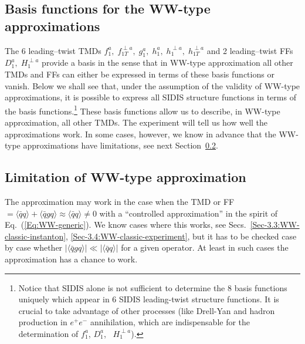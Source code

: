 \documentclass[a4paper,11pt]{article}
\newcommand{\blue}[1]{{\color{blue} #1}}
\newcommand{\la}{\langle}
\newcommand{\ra}{\rangle}
\newcommand{\ps}[1]{\blue{#1}}
\begin{document}
\subsection{Basis functions for the WW-type approximations}
\label{Sec-3.7:basis}

The 6 leading--twist TMDs
$f_1^a, \; f_{1T}^{\perp a}, \; g_1^a, \; h_1^a, \;h_1^{\perp a},\; h_{1T}^{\perp a}$
and 2 leading--twist FFs $D_1^a, \; H_1^{\perp a}$ provide a basis
in the sense that in WW-type approximation all other TMDs and FFs
can either be expressed in terms of these basis functions or vanish.
Below we shall see that, under the assumption of the validity of WW-type
approximations, it is possible to express all SIDIS structure functions
in terms of the basis functions.\footnote{%
   Notice that SIDIS alone is not sufficient to determine
   the \ps{8 basis functions uniquely which} appear in 6 SIDIS
   leading-twist structure functions. It is crucial to take
   advantage of other processes (like Drell-Yan and hadron production in
   $e^+e^-$ annihilation, which are indispensable for the determination
   of $f_1^a$, $D_1^a$,~\ps{$H_1^{\perp a}$}).}
These basis functions allow us to describe, in WW-type approximation,
all other TMDs. The experiment will tell us how well the approximations work.
In some cases, however, we know in advance that the WW-type approximations
have limitations, see next Section~\ref{Sec-3.8:limitations}.

\subsection{Limitation of WW-type approximation}
\label{Sec-3.8:limitations}

The approximation may work in the case when the TMD or FF
$=\la\bar{q}q\ra + \la\bar{q}gq\ra \approx \la\bar{q}q\ra \neq 0$ with
a ``controlled approximation'' in the spirit of Eq.~(\ref{Eq:WW-generic}).
We know cases where this works, see
Secs.~\ref{Sec-3.3:WW-classic-instanton}, \ref{Sec-3.4:WW-classic-experiment},
but it has to be checked case by case whether
$| \la\bar{q}gq\ra  | \ll  |\la\bar{q}q\ra|$ for a given operator.
At least in such cases the approximation has a chance to work.
\end{document}
